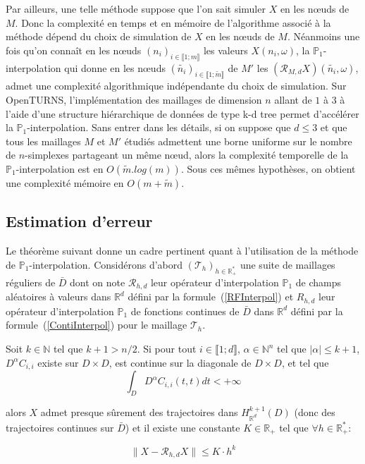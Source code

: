 Par ailleurs, une telle méthode suppose que l'on sait simuler $X$ en les n\oe uds de $M$. Donc la complexité en temps et en mémoire
de l'algorithme associé à la méthode dépend du choix de simulation de $X$ en les n\oe uds de $M$. Néanmoins une fois qu'on connaît
en les n\oe uds $(n_i)_{i \in \llbracket 1;m \rrbracket}$ les valeurs $X(n_i,\omega)$, la $\mathbb{P}_1$-interpolation qui donne
en les n\oe uds $(\tilde{n_{i}})_{i \in \llbracket 1;\tilde{m} \rrbracket}$ de $M'$ les $(\mathcal{R}_{M,d}X)(\tilde{n_{i}},\omega)$, admet une complexité algorithmique indépendante
du choix de simulation. Sur OpenTURNS, l'implémentation des maillages de dimension $n$ allant de $1$ à $3$ à l'aide
d'une structure hiérarchique de données de type k-d tree permet d'accélérer la $\mathbb{P}_1$-interpolation. Sans entrer
dans les détails, si on suppose que $d \leq 3$ et que tous les maillages $M$ et $M'$ étudiés admettent une borne uniforme sur le
nombre de $n$-simplexes partageant un même n\oe ud, alors la complexité temporelle de la $\mathbb{P}_1$-interpolation
est en $O(\tilde{m}.log(m))$. Sous ces mêmes hypothèses, on obtient une complexité mémoire en $O(m+\tilde{m})$.


\subsection{Estimation d'erreur}

Le théorème suivant donne un cadre pertinent quant à l'utilisation de la méthode de $\mathbb{P}_1$-interpolation.
Considérons d'abord $(\mathcal{T}_h)_{h \in \mathbb{R}^{*}_{+}}$ une suite de maillages réguliers de $\bar{D}$
dont on note $\mathcal{R}_{h,d}$ leur opérateur d'interpolation $\mathbb{P}_1$
de champs aléatoires à valeurs dans $\mathbb{R}^d$ défini par la formule~(\ref{RFInterpol}) et $R_{h,d}$  leur opérateur d'interpolation $\mathbb{P}_1$ de fonctions continues de $\bar{D}$ dans $\mathbb{R}^d$ défini par la formule~(\ref{ContiInterpol}) pour le maillage $\mathcal{T}_h$.

\begin{theorem}
\label{EstimeeTheo}
Soit $k \in \mathbb{N}$ tel que $k+1 > n/2$. Si pour tout $i \in \llbracket 1;d \rrbracket$, $\alpha \in \mathbb{N}^{n}$ tel que $|\alpha| \leq k+1$, $D^{\alpha}C_{i,i}$ existe
sur $D \times D$, est continue sur la diagonale de $D \times D$, et tel que
\begin{equation}
\displaystyle\int_D D^{\alpha}C_{i,i}(t,t) dt < +\infty
\end{equation}

\noindent alors $X$ admet presque sûrement des trajectoires dans $H^{k+1}_{\mathbb{R}^d}(D)$ (donc des trajectoires continues sur $\bar{D}$) et il existe une constante $K \in \mathbb{R}_{+}$ tel que $\forall h \in \mathbb{R}_{+}^{*}$:

\begin{equation}
\|X - \mathcal{R}_{h,d}X \| \leq K \cdot h^{k} 
\end{equation}
\end{theorem}

